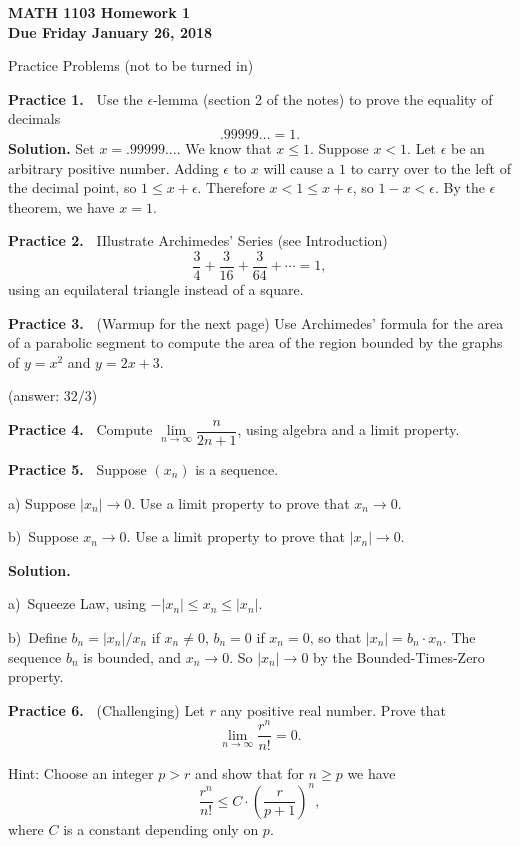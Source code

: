 \documentclass[12pt]{article}
\newcommand{\ep}{\epsilon}
\theoremstyle{definition}
\theoremstyle{remark}
\theoremstyle{definition}
\newenvironment{Solution}{\noindent\textbf{Solution.}}{}
\begin{document}
  

{\bf MATH 1103 Homework 1}\\
{\bf Due Friday January 26, 2018}

Practice Problems (not to be turned in)

\vskip5pt
{\bf Practice 1.\ } Use the $\ep$-lemma (section 2 of the notes) to prove the equality of decimals
\[.99999\dots=1.\]
\begin{Solution}
Set $x=.99999\dots$.  We know that $x\leq 1$. Suppose $x<1$. 
Let $\ep$ be an arbitrary positive number. Adding $\ep$ to $x$ will cause a $1$ to carry over to the left of the decimal point, so $1\leq x+\ep$. 
Therefore $ x< 1\leq x+\ep$, so $1-x<\ep$. By the $\ep$ theorem, we have $x=1$. 
\end{Solution}

{\bf Practice 2.\ } IIlustrate Archimedes' Series (see Introduction) 
\[\frac{3}{4}+\frac{3}{16}+\frac{3}{64}+\cdots=1,\]
using an equilateral triangle instead of a square. 

{\bf Practice 3.\ } (Warmup for the next page) Use Archimedes' formula for the area of a parabolic segment to compute the area of the region bounded by the graphs of $y=x^2$ and $y=2x+3$. 

(answer: $32/3$)

{\bf Practice 4.\ } Compute $\lim\limits_{n\to\infty}\dfrac{n}{2n+1}$, using algebra and a limit property. 

{\bf Practice 5.\ } Suppose $(x_n)$ is a sequence. 

a) Suppose $|x_n|\to 0$. Use a limit property to prove that $x_n\to 0$.

b)\ Suppose $x_n\to 0$. Use a limit property to prove that $|x_n|\to 0$.

\begin{Solution}

a)\ Squeeze Law, using $-|x_n|\leq x_n\leq |x_n|$. 

b)\ Define $b_n=|x_n|/x_n$ if $x_n\neq 0$, $b_n=0$ if $x_n=0$, 
so that $|x_n|=b_n\cdot x_n$. 
The sequence $b_n$ is bounded, and $x_n\to 0$. So $|x_n|\to 0$ by the Bounded-Times-Zero property. 

\end{Solution}

{\bf Practice 6.\ } (Challenging) Let $r$ any positive real number. 
Prove that 
\[\lim_{n\to\infty}\dfrac{r^n}{n!}=0.\] 

Hint: Choose an integer $p>r$ and show that for $n\geq p$ we have
\[\frac{r^n}{n!}\leq C\cdot \left(\frac{r}{p+1}\right)^n,\]
where $C$ is a constant depending only on $p$. 
\end{document}
